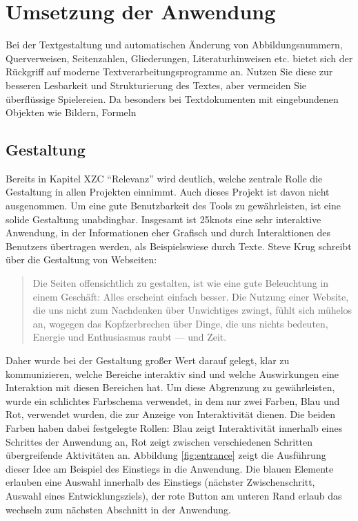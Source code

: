 \chapter{Umsetzung der Anwendung}
\thispagestyle{fancy}
Bei der Textgestaltung und automatischen Änderung von Abbildungsnummern, Querverweisen,
Seitenzahlen, Gliederungen, Literaturhinweisen etc. bietet sich der Rückgriff
auf moderne Textverarbeitungsprogramme an. Nutzen Sie diese zur besseren Lesbarkeit
und Strukturierung des Textes, aber vermeiden Sie überflüssige Spielereien. Da
besonders bei Textdokumenten mit eingebundenen Objekten wie Bildern, Formeln

\section{Gestaltung}
Bereits in Kapitel XZC “Relevanz” wird deutlich, welche zentrale Rolle die Gestaltung in allen Projekten einnimmt. Auch dieses Projekt ist davon nicht ausgenommen. Um eine gute Benutzbarkeit des Tools zu gewährleisten, ist eine solide Gestaltung unabdingbar.
Insgesamt ist 25knots eine sehr interaktive Anwendung, in der Informationen eher Grafisch und durch Interaktionen des Benutzers übertragen werden, als Beispielswiese durch Texte. Steve Krug schreibt über die Gestaltung von Webseiten:

\begin{quote}
  Die Seiten offensichtlich zu gestalten, ist wie eine gute Beleuchtung in einem Geschäft: Alles erscheint einfach besser. Die Nutzung einer Website, die uns nicht zum Nachdenken über Unwichtiges zwingt, fühlt sich mühelos an, wogegen das Kopfzerbrechen über Dinge, die uns nichts bedeuten, Energie und Enthusiasmus raubt — und Zeit. \cite[S. 19]{Krug201410}
\end{quote}

Daher wurde bei der Gestaltung großer Wert darauf gelegt, klar zu kommunizieren, welche Bereiche interaktiv sind und welche Auswirkungen eine Interaktion mit diesen Bereichen hat.
Um diese Abgrenzung zu gewährleisten, wurde ein schlichtes Farbschema verwendet, in dem nur zwei Farben, Blau und Rot, verwendet wurden, die zur Anzeige von Interaktivität dienen.
Die beiden Farben haben dabei festgelegte Rollen: Blau zeigt Interaktivität innerhalb eines Schrittes der Anwendung an, Rot zeigt zwischen verschiedenen Schritten übergreifende Aktivitäten an. Abbildung \ref{fig:entrance} zeigt die Ausführung dieser Idee am Beispiel des Einstiegs in die Anwendung. Die blauen Elemente erlauben eine Auswahl innerhalb des Einstiegs (nächster Zwischenschritt, Auswahl eines Entwicklungsziels), der rote Button am unteren Rand erlaub das wechseln zum nächsten Abschnitt in der Anwendung.


